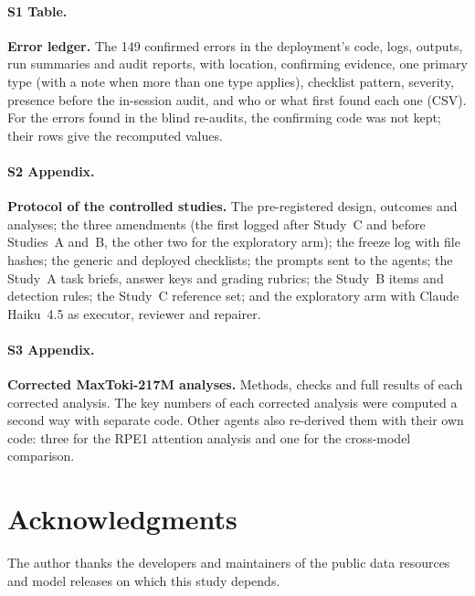 \documentclass[10pt,letterpaper]{article}
\begin{document}
\paragraph*{S1 Table.}
\label{S1_Table}
{\bf Error ledger.} The 149 confirmed errors in the deployment's code,
logs, outputs, run summaries and audit reports, with location,
confirming evidence, one primary type (with a note when more than one
type applies), checklist pattern, severity, presence before the
in-session audit, and who or what first found each one (CSV). For the errors
found in the blind re-audits, the confirming code was not kept; their
rows give the recomputed values.

\paragraph*{S2 Appendix.}
\label{S2_Appendix}
{\bf Protocol of the controlled studies.} The pre-registered design,
outcomes and analyses; the three amendments (the first logged after
Study~C and before Studies~A and~B, the other two for the exploratory
arm); the freeze log with file hashes; the generic and deployed
checklists; the prompts sent to the agents; the Study~A task briefs,
answer keys and grading rubrics; the Study~B items and detection rules;
the Study~C reference set; and the exploratory arm with Claude Haiku~4.5
as executor, reviewer and repairer.

\paragraph*{S3 Appendix.}
\label{S3_Appendix}
{\bf Corrected MaxToki-217M analyses.} Methods, checks and full results
of each corrected analysis. The key numbers of each corrected analysis
were computed a second way with separate code. Other agents also
re-derived them with their own code: three for the RPE1 attention
analysis and one for the cross-model comparison.

\section*{Acknowledgments}
The author thanks the developers and maintainers of the public data
resources and model releases on which this study depends.

\nolinenumbers


\end{document}
